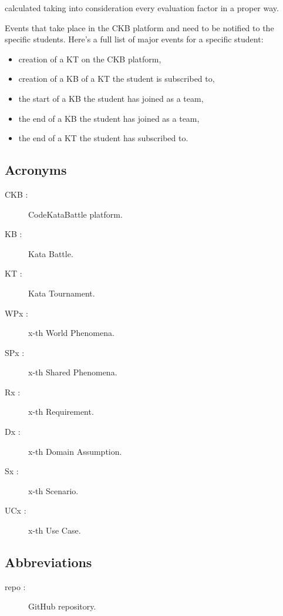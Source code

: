 \documentclass[11pt]{report}
\begin{document}
\begin{description}
            calculated taking into consideration every evaluation factor in a proper way.
        \item[Major Event :] Events that take place in the CKB platform and need to be notified to the specific students.
            Here's a full list of major events for a specific student:
            \begin{itemize}
                \item creation of a KT on the CKB platform,
                \item creation of a KB of a KT the student is subscribed to,
                \item the start of a KB the student has joined as a team,
                \item the end of a KB the student has joined as a team,
                \item the end of a KT the student has subscribed to.
            \end{itemize}
    \end{description}

    \subsection{Acronyms}
    \begin{description}
        \item[CKB :] CodeKataBattle platform.
        \item[KB :] Kata Battle.
        \item[KT :] Kata Tournament.
        \item[WPx :] x-th World Phenomena.
        \item[SPx :] x-th Shared Phenomena.
        \item[Rx :] x-th Requirement.
        \item[Dx :] x-th Domain Assumption.
        \item[Sx :] x-th Scenario.
        \item[UCx :] x-th Use Case.
    \end{description}

    \subsection{Abbreviations}
    \begin{description}
        \item[repo :] GitHub repository.
    \end{description}
\end{document}
